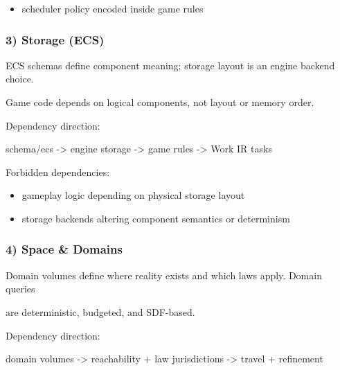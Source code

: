\documentclass[9pt,a4paper,openany]{book}
\begin{document}
\begin{itemize}
\item scheduler policy encoded inside game rules
\end{itemize}





\subsubsection{3) Storage (ECS)}


ECS schemas define component meaning; storage layout is an engine backend choice.\allowbreak{}



Game code depends on logical components, not layout or memory order.\allowbreak{}






Dependency direction:



schema/\allowbreak{}ecs -\allowbreak{}> engine storage -\allowbreak{}> game rules -\allowbreak{}> Work IR tasks






Forbidden dependencies:



\begin{itemize}
\item gameplay logic depending on physical storage layout
\end{itemize}


\begin{itemize}
\item storage backends altering component semantics or determinism
\end{itemize}





\subsubsection{4) Space \& Domains}
Domain volumes define where reality exists and which laws apply.\allowbreak{} Domain queries

are deterministic, budgeted, and SDF-\allowbreak{}based.\allowbreak{}


Dependency direction:

domain volumes -\allowbreak{}> reachability + law jurisdictions -\allowbreak{}> travel + refinement
\end{document}
